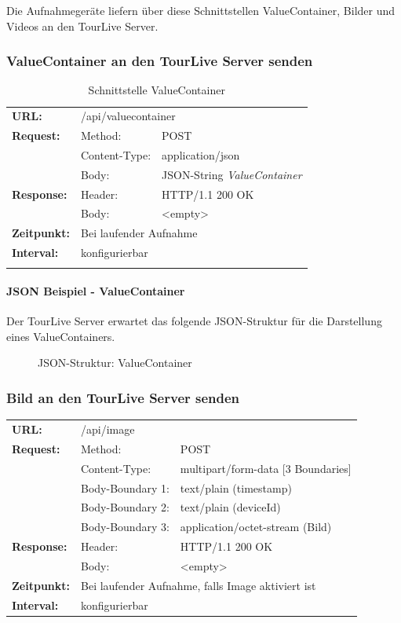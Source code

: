 Die Aufnahmegeräte liefern über diese Schnittstellen ValueContainer, Bilder und Videos an den TourLive Server.

\subsubsection{ValueContainer an den TourLive Server senden}
\begin{longtable}{ p{2.5cm} p{3.5cm} p{6cm}}
	\textbf{URL:} & \multicolumn{2}{p{10cm}}{/api/valuecontainer} \\
	\textbf{Request:} & Method: & POST \\
		& Content-Type: & application/json \\
		& Body: & JSON-String \textit{ValueContainer}\\
	\textbf{Response:} & Header: & HTTP/1.1 200 OK \\
		& Body: & <empty> \\
	\textbf{Zeitpunkt:} & \multicolumn{2}{p{10cm}}{Bei laufender Aufnahme} \\ 
	\textbf{Interval:} & \multicolumn{2}{p{10cm}}{konfigurierbar} \\ 
	\caption{Schnittstelle ValueContainer}
\end{longtable}

\paragraph{JSON Beispiel - ValueContainer}
Der TourLive Server erwartet das folgende JSON-Struktur für die Darstellung eines ValueContainers.

\begin{figure}[htb]
	\centering
	
	\caption{JSON-Struktur: ValueContainer}
	\label{fig:valuecontainer}
\end{figure}

\subsubsection{Bild an den TourLive Server senden}
\begin{longtable}{ p{2.5cm} p{3.5cm} p{6cm}}
	\textbf{URL:} & \multicolumn{2}{p{10cm}}{/api/image} \\
	\textbf{Request:} & Method: & POST \\
		& Content-Type: & multipart/form-data [3 Boundaries] \\
		& Body-Boundary 1: & text/plain (timestamp) \\
		& Body-Boundary 2: & text/plain (deviceId) \\
		& Body-Boundary 3: & application/octet-stream (Bild) \\
	\textbf{Response:} & Header: & HTTP/1.1 200 OK \\
		& Body: & <empty> \\
	\textbf{Zeitpunkt:} & \multicolumn{2}{p{10cm}}{Bei laufender Aufnahme, falls Image aktiviert ist} \\ 
	\textbf{Interval:} & \multicolumn{2}{p{10cm}}{konfigurierbar}
\end{longtable}

